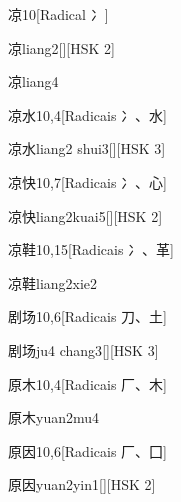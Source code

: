 \begin{entry}{凉}{10}[Radical ⼎]
  \begin{phonetics}{凉}{liang2}[][HSK 2]
  \end{phonetics}
  \begin{phonetics}{凉}{liang4}
  \end{phonetics}
\end{entry}

\begin{entry}{凉水}{10,4}[Radicais ⼎、⽔]
  \begin{phonetics}{凉水}{liang2 shui3}[][HSK 3]
  \end{phonetics}
\end{entry}

\begin{entry}{凉快}{10,7}[Radicais ⼎、⼼]
  \begin{phonetics}{凉快}{liang2kuai5}[][HSK 2]
  \end{phonetics}
\end{entry}

\begin{entry}{凉鞋}{10,15}[Radicais ⼎、⾰]
  \begin{phonetics}{凉鞋}{liang2xie2}
  \end{phonetics}
\end{entry}

\begin{entry}{剧场}{10,6}[Radicais ⼑、⼟]
  \begin{phonetics}{剧场}{ju4 chang3}[][HSK 3]
  \end{phonetics}
\end{entry}

\begin{entry}{原木}{10,4}[Radicais ⼚、⽊]
  \begin{phonetics}{原木}{yuan2mu4}
  \end{phonetics}
\end{entry}

\begin{entry}{原因}{10,6}[Radicais ⼚、⼞]
  \begin{phonetics}{原因}{yuan2yin1}[][HSK 2]
  \end{phonetics}
\end{entry}

